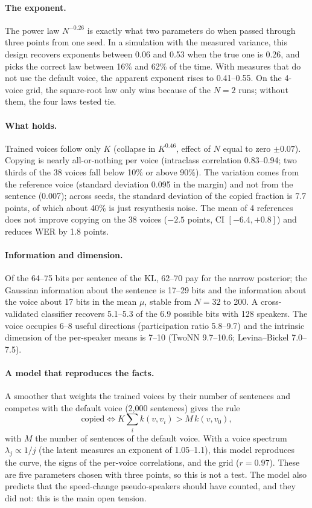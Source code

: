 \documentclass[a4paper,11pt]{article}
\begin{document}
\paragraph{The exponent.} The power law $N^{-0.26}$ is exactly what two parameters do when passed through three points from one seed. In a simulation with the measured variance, this design recovers exponents between 0.06 and 0.53 when the true one is 0.26, and picks the correct law between 16\% and 62\% of the time. With measures that do not use the default voice, the apparent exponent rises to 0.41--0.55. On the 4-voice grid, the square-root law only wins because of the $N=2$ runs; without them, the four laws tested tie.

\paragraph{What holds.} Trained voices follow only $K$ (collapse in $K^{0.46}$, effect of $N$ equal to zero $\pm 0.07$). Copying is nearly all-or-nothing per voice (intraclass correlation 0.83--0.94; two thirds of the 38 voices fall below 10\% or above 90\%). The variation comes from the reference voice (standard deviation 0.095 in the margin) and not from the sentence (0.007); across seeds, the standard deviation of the copied fraction is 7.7 points, of which about 40\% is just resynthesis noise. The mean of 4 references does not improve copying on the 38 voices ($-2.5$ points, CI $[-6.4, +0.8]$) and reduces WER by 1.8 points.

\paragraph{Information and dimension.} Of the 64--75 bits per sentence of the KL, 62--70 pay for the narrow posterior; the Gaussian information about the sentence is 17--29 bits and the information about the voice about 17 bits in the mean $\mu$, stable from $N=32$ to 200. A cross-validated classifier recovers 5.1--5.3 of the 6.9 possible bits with 128 speakers. The voice occupies 6--8 useful directions (participation ratio 5.8--9.7) and the intrinsic dimension of the per-speaker means is 7--10 (TwoNN 9.7--10.6; Levina--Bickel 7.0--7.5).

\paragraph{A model that reproduces the facts.} A smoother that weights the trained voices by their number of sentences and competes with the default voice (2,000 sentences) gives the rule
\[
\text{copied} \iff K\textstyle\sum_i k(v,v_i) > M\,k(v,v_0),
\]
with $M$ the number of sentences of the default voice. With a voice spectrum $\lambda_j\propto 1/j$ (the latent measures an exponent of 1.05--1.1), this model reproduces the curve, the signs of the per-voice correlations, and the grid ($r=0.97$). These are five parameters chosen with three points, so this is not a test. The model also predicts that the speed-change pseudo-speakers should have counted, and they did not: this is the main open tension.
\end{document}
